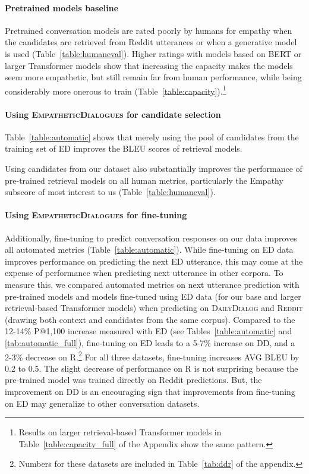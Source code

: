 \documentclass[11pt,a4paper]{article}
\newcommand\datasetname{\textsc{EmpatheticDialogues}}
\newcommand\datasetabbrev{ED}
\begin{document}
\paragraph{Pretrained models baseline}
Pretrained conversation models are rated poorly by humans for empathy when the candidates are retrieved from 
Reddit utterances or when a generative model is used  (Table~\ref{table:humaneval}). Higher ratings with models based on BERT or larger Transformer models show that increasing the capacity makes the models seem more empathetic, but still remain far
from human performance, while being considerably more onerous to train (Table~\ref{table:capacity}).\footnote{Results on larger retrieval-based Transformer models in Table~\ref{table:capacity_full} of the Appendix show the same pattern.}

\paragraph{Using \datasetname{} for candidate selection}
Table~\ref{table:automatic} shows that merely using the pool of candidates from the training set of \datasetabbrev{} improves the BLEU scores of retrieval models.





Using candidates from our dataset also substantially improves the performance of pre-trained retrieval models on all human metrics, particularly the Empathy subscore of most interest to us (Table~\ref{table:humaneval}).  


\paragraph{Using \datasetname{} for fine-tuning}
Additionally, fine-tuning to predict conversation responses on our data improves all automated metrics (Table~\ref{table:automatic}). 
While fine-tuning on ED data improves performance on predicting the next ED utterance, this may come at the expense of performance when predicting next utterance in other corpora. To measure this, we compared automated metrics on next utterance prediction with pre-trained models and models fine-tuned using ED data (for our base and larger retrieval-based Transformer models) when predicting on 
\textsc{DailyDialog} and \textsc{Reddit} (drawing both context and candidates from the same corpus).
Compared to the 12-14\% P@1,100 increase measured with ED (see Tables~\ref{table:automatic} and \ref{tab:automatic_full}), fine-tuning on ED leads to a 5-7\% increase on DD, and a 2-3\% decrease on R.\footnote{Numbers for these datasets are included in Table~\ref{tab:ddr} of the appendix.} For all three datasets, fine-tuning increases AVG BLEU by 0.2 to 0.5.
The slight decrease of performance on R is not surprising because the pre-trained model was trained directly on Reddit predictions. But, the improvement on DD is an encouraging sign that improvements from fine-tuning on ED may generalize to other conversation datasets. 
\end{document}
